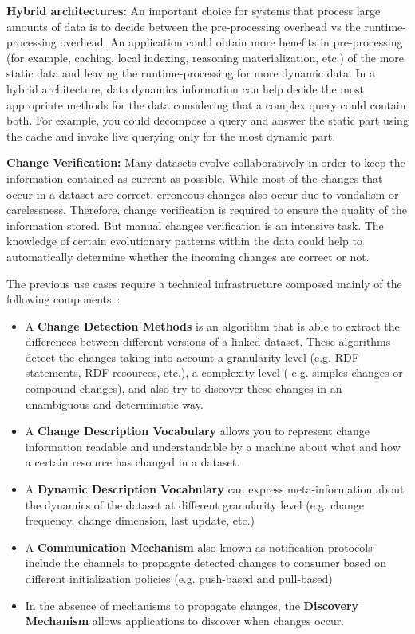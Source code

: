 \documentclass[sw]{iosart2x}
\begin{document}
\textbf{Hybrid architectures: }
An important choice for systems that process large amounts of data is to decide between the pre-processing overhead vs the runtime-processing overhead. An application could obtain more benefits in pre-processing (for example, caching, local indexing, reasoning materialization, etc.) of the more static data and leaving the runtime-processing for more dynamic data. In a hybrid architecture, data dynamics information can help decide the most appropriate methods for the data considering that a complex query could contain both. For example, you could decompose a query and answer the static part using the cache and invoke live querying only for the most dynamic part.

\textbf{Change Verification:}
Many datasets evolve collaboratively in order to keep the information contained as current as possible. While most of the changes that occur in a dataset are correct, erroneous changes also occur due to vandalism or carelessness. Therefore, change verification is required to ensure the quality of the information stored. But manual changes verification is an intensive task. The knowledge of certain evolutionary patterns within the data could help to automatically determine whether the incoming changes are correct or not.

The previous use cases require a technical infrastructure composed mainly of the following components~\cite{UmbrichVH10, PopitschH11}:

\begin{itemize}

\item A \textbf{Change Detection Methods} is an algorithm that is able to extract the differences between different versions of a linked dataset. These algorithms detect the changes taking into account a granularity level (e.g. RDF statements, RDF resources, etc.), a complexity level ( e.g. simples changes or compound changes), and also try to discover these changes in an unambiguous and deterministic way.

\item A \textbf{Change Description Vocabulary} allows you to represent change information readable and understandable by a machine about what and how a certain resource has changed in a dataset.

\item A \textbf{Dynamic Description Vocabulary} can express meta-information about the dynamics of the dataset at different granularity level (e.g. change frequency, change dimension, last update, etc.)

\item A \textbf{Communication Mechanism} also known as notification protocols include the channels to propagate detected changes to consumer based on different initialization policies (e.g. push-based and pull-based)

\item In the absence of mechanisms to propagate changes, the \textbf{Discovery Mechanism} allows applications to discover when changes occur.

\end{itemize}
\end{document}
